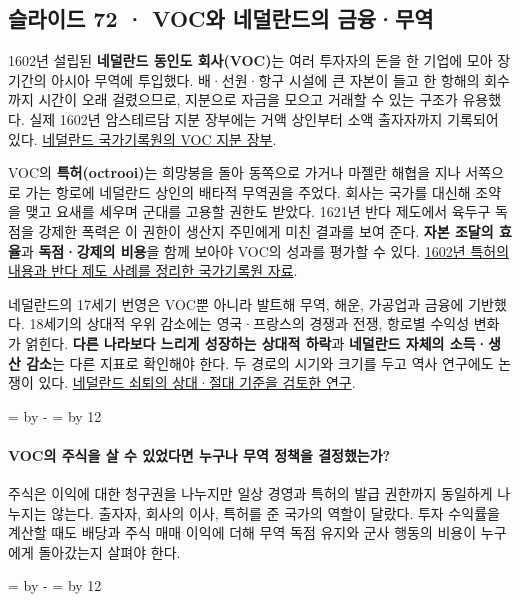 \documentclass[10pt,a4paper]{article}
\newcommand{\ReserveQuestionSpace}{%
  \par\begingroup
  \dimen0=\pagegoal \advance\dimen0 by -\pagetotal
  \dimen2=\baselineskip \multiply\dimen2 by 12
  \ifdim\dimen0<\dimen2 \newpage\fi
  \endgroup}
\begin{document}
\subsection{슬라이드 72 · VOC와 네덜란드의 금융·무역}
1602년 설립된 \textbf{네덜란드 동인도 회사(VOC)}는 여러 투자자의 돈을 한 기업에 모아 장기간의 아시아 무역에 투입했다. 배·선원·항구 시설에 큰 자본이 들고 한 항해의 회수까지 시간이 오래 걸렸으므로, 지분으로 자금을 모으고 거래할 수 있는 구조가 유용했다. 실제 1602년 암스테르담 지분 장부에는 거액 상인부터 소액 출자자까지 기록되어 있다. \href{https://www.nationaalarchief.nl/beleven/onderwijs/bronnenbox/aandelen-voc-1602}{네덜란드 국가기록원의 VOC 지분 장부}.\par

VOC의 \textbf{특허(octrooi)}는 희망봉을 돌아 동쪽으로 가거나 마젤란 해협을 지나 서쪽으로 가는 항로에 네덜란드 상인의 배타적 무역권을 주었다. 회사는 국가를 대신해 조약을 맺고 요새를 세우며 군대를 고용할 권한도 받았다. 1621년 반다 제도에서 육두구 독점을 강제한 폭력은 이 권한이 생산지 주민에게 미친 결과를 보여 준다. \textbf{자본 조달의 효율}과 \textbf{독점·강제의 비용}을 함께 보아야 VOC의 성과를 평가할 수 있다. \href{https://www.nationaalarchief.nl/beleven/onderwijs/bronnenbox/octrooi-voor-de-voc-1602}{1602년 특허의 내용과 반다 제도 사례를 정리한 국가기록원 자료}.\par

네덜란드의 17세기 번영은 VOC뿐 아니라 발트해 무역, 해운, 가공업과 금융에 기반했다. 18세기의 상대적 우위 감소에는 영국·프랑스의 경쟁과 전쟁, 항로별 수익성 변화가 얽힌다. \textbf{다른 나라보다 느리게 성장하는 상대적 하락}과 \textbf{네덜란드 자체의 소득·생산 감소}는 다른 지표로 확인해야 한다. 두 경로의 시기와 크기를 두고 역사 연구에도 논쟁이 있다. \href{https://academic.oup.com/book/10273/chapter-abstract/157990616}{네덜란드 쇠퇴의 상대·절대 기준을 검토한 연구}.\par

\ReserveQuestionSpace
\paragraph{VOC의 주식을 살 수 있었다면 누구나 무역 정책을 결정했는가?}
주식은 이익에 대한 청구권을 나누지만 일상 경영과 특허의 발급 권한까지 동일하게 나누지는 않는다. 출자자, 회사의 이사, 특허를 준 국가의 역할이 달랐다. 투자 수익률을 계산할 때도 배당과 주식 매매 이익에 더해 무역 독점 유지와 군사 행동의 비용이 누구에게 돌아갔는지 살펴야 한다.\par

\ReserveQuestionSpace
\end{document}
